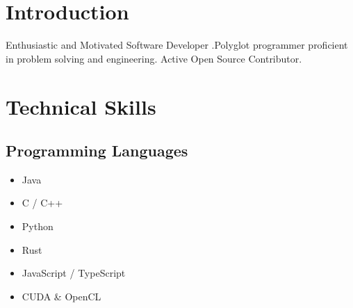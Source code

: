 \documentclass{article}
\date{}
\begin{document}
\title{\LARGE}
\author{\LARGE \textbf{Jagadeesh \textcolor{violet}{Kotra}} }
\maketitle

\section{Introduction}

Enthusiastic and Motivated Software Developer%
.Polyglot programmer proficient in problem solving and engineering. Active Open Source Contributor.

\section{Technical Skills}
\subsection{Programming Languages}
\begin{multicols}{3}
    \begin{itemize}
    	\item Java
        \item C / C++
        \item Python
        \item Rust
        \item JavaScript / TypeScript
        \item CUDA \& OpenCL
    \end{itemize}
\end{multicols}
\end{document}
